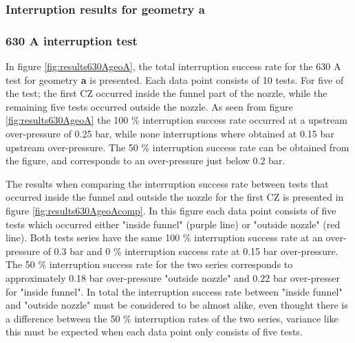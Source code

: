 \documentclass[10pt,b5paper,twoside]{article}
\begin{document}
\subsubsection{Interruption results for geometry \textbf{a}}

\subsubsection*{630 A interruption test}

In figure \ref{fig:results630AgeoA}, the total interruption success rate for the 630 A test for geometry \textbf{a} is presented. Each data point consists of 10 tests. For five of the test; the first CZ occurred inside the funnel part of the nozzle, while the remaining five tests occurred outside the nozzle. As seen from figure \ref{fig:results630AgeoA} the 100 \% interruption success rate occurred at a upstream over-pressure of 0.25 bar, while none interruptions where obtained at 0.15 bar upstream over-pressure. The 50 \% interruption success rate can be obtained from the figure, and corresponds to an over-pressure just below 0.2 bar.

The results when comparing the interruption success rate between tests that occurred inside the funnel and outside the nozzle for the first CZ is presented in figure \ref{fig:results630AgeoAcomp}. In this figure each data point consists of five tests which occurred either "inside funnel" (purple line) or "outside nozzle" (red line). Both tests series have the same 100 \% interruption success rate at an over-pressure of 0.3 bar and 0 \% interruption success rate at 0.15 bar over-pressure. The 50 \% interruption success rate for the two series corresponds to approximately 0.18 bar over-pressure "outside nozzle" and 0.22 bar over-presser for "inside funnel". In total the interruption success rate between "inside funnel" and "outside nozzle" must be considered to be almost alike, even thought there is a difference between the 50 \% interruption rates of the two series, variance like this must be expected when each data point only consists of five tests.
\end{document}
